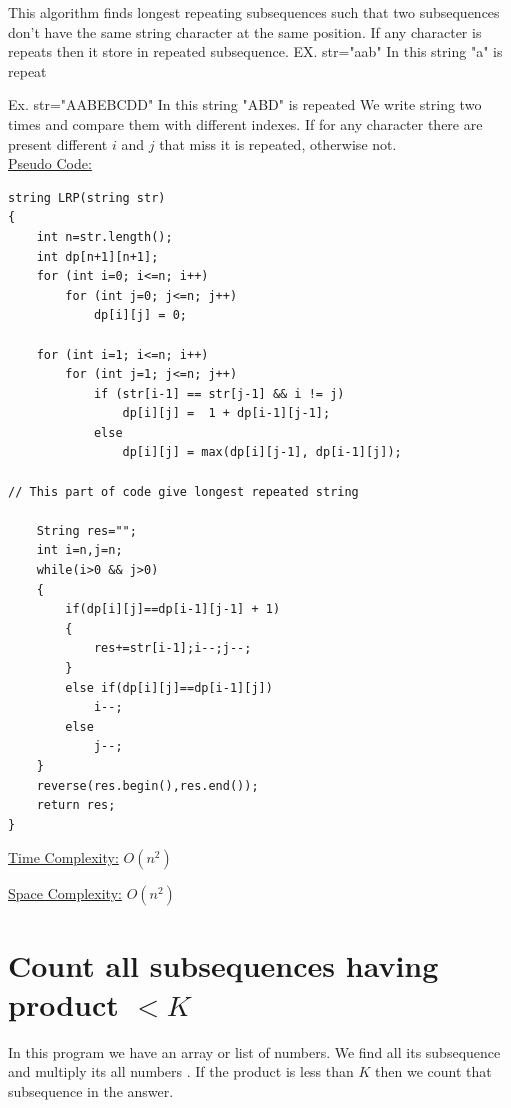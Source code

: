 \documentclass[12pt]{book}
\begin{document}
This algorithm finds longest repeating subsequences such that two subsequences don’t have the same string character at the same position.\newline
If any character is repeats then it store in repeated subsequence.\newline
EX. str="aab"\newline
	In this string "a" is repeat\newline

Ex. str="AABEBCDD"\newline
	In this string "ABD" is repeated\newline
We write string two times and compare them with different indexes. If for any character there are present different $i$ and $j$ that miss it is repeated, otherwise not.\\

\underline{Pseudo Code:}\newline

\begin{lstlisting}
string LRP(string str)
{
    int n=str.length();
    int dp[n+1][n+1];
    for (int i=0; i<=n; i++)
        for (int j=0; j<=n; j++)
            dp[i][j] = 0;

    for (int i=1; i<=n; i++)
        for (int j=1; j<=n; j++)
            if (str[i-1] == str[j-1] && i != j)
                dp[i][j] =  1 + dp[i-1][j-1];
            else
                dp[i][j] = max(dp[i][j-1], dp[i-1][j]);
 
// This part of code give longest repeated string

    String res="";
    int i=n,j=n;
    while(i>0 && j>0)
    {
        if(dp[i][j]==dp[i-1][j-1] + 1)
        {
            res+=str[i-1];i--;j--;
        }
        else if(dp[i][j]==dp[i-1][j])
            i--;
        else
            j--;
    }
    reverse(res.begin(),res.end());
    return res;
}

\end{lstlisting}

\underline{Time Complexity:}  $O(n^2)$\newline

\underline{Space Complexity:} $O(n^2)$\\


\section{Count all subsequences having product $< K$}
In this program we have an array or list of numbers. We find all its subsequence and multiply its all numbers . If the product is less than $K$ then we count that subsequence in the answer.\newline
\end{document}
